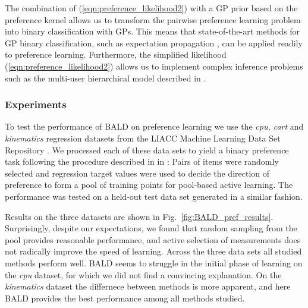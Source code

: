 The combination of (\ref{eqn:preference_likelihood2}) with a GP prior based on the preference kernel allows us to transform the pairwise preference learning problem into  binary classification with GPs. This means that state-of-the-art methods for GP binary classification, such as expectation propagation \citep{Minka2001}, can be applied readily to preference learning. Furthermore, the simplified likelihood (\ref{eqn:preference_likelihood2}) allows us to implement complex inference problems such as the multi-user hierarchical model described in \citep{Houlsby2012preference}.

\subsubsection{Experiments}

To test the performance of BALD on preference learning we use the \emph{cpu, cart} and \emph{kinematics} regression datasets from the LIACC Machine Learning Data Set Repository \citep{LIABCRepository}. We processed each of these data sets to yield a binary preference task following the procedure described in in \cite{Chu2005}: Pairs of items were randomly selected and regression target values were used to decide the direction of preference to form a pool of training points for pool-based active learning. The performance was tested on a held-out test data set generated in a similar fashion.

Results on the three datasets are shown in Fig.\ \ref{fig:BALD_pref_results}.  Surprisingly, despite our expectations, we found that random sampling from the pool provides reasonable performance, and active selection of measurements does not radically improve the speed of learning. Across the three data sets all studied methods perform well. BALD seems to struggle in the initial phase of learning on the \emph{cpu} dataset, for which we did not find a convincing explanation. On the \emph{kinematics} dataset the differnece between methods is more apparent, and here BALD provides the best performance among all methods studied.

